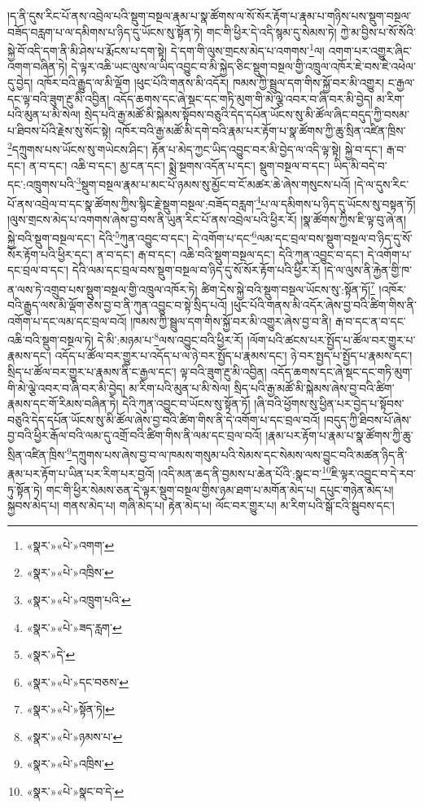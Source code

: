 །ད་ནི་དུས་རིང་པོ་ནས་འབྲེལ་པའི་སྡུག་བསྔལ་རྣམ་པ་སྣ་ཚོགས་ལ་སོ་སོར་རྟོག་པ་རྣམ་པ་གཉིས་པས་སྡུག་བསྔལ་བཟོད་བརླག་པ་ལ་དམིགས་པ་ཉིད་དུ་ཡོངས་སུ་སྟོན་ཏེ། གང་གི་ཕྱིར་དེ་འདི་སྙམ་དུ་སེམས་ཏེ། ཀྱེ་མ་བྱིས་པ་སོ་སོའི་སྐྱེ་བོ་འདི་དག་ནི་མི་ཤེས་པ་རྨོངས་པ་དག་སྟེ། དེ་དག་གི་ལུས་གྲངས་མེད་པ་འགགས་\footnote{«སྣར་»«པེ་»འགག་}ལ། འགག་པར་འགྱུར་ཞིང་འགག་བཞིན་ཏེ། དེ་ལྟར་འཆི་ཡང་ལུས་ལ་ཡིད་འབྱུང་བ་མི་སྐྱེད་ཅིང་སྡུག་བསྔལ་གྱི་འཁྲུལ་འཁོར་ཇེ་བས་ཇེ་འཕེལ་དུ་བྱེད། འཁོར་བའི་རྒྱུད་ལ་མི་ལྡོག །ཕུང་པོའི་གནས་མི་འདོར། ཁམས་ཀྱི་སྦྲུལ་དག་གིས་སྐྱོ་བར་མི་འགྱུར། ང་རྒྱལ་དང་ལྟ་བའི་ཟུག་རྔུ་མི་འབྱིན། འདོད་ཆགས་དང་ཞེ་སྡང་དང་གཏི་མུག་གི་མེ་ལྕེ་འབར་བ་ཞི་བར་མི་བྱེད། མ་རིག་པའི་མུན་པ་མི་སེལ། སྲེད་པའི་རྒྱ་མཚོ་མི་སྐེམས་སྟོབས་བཅུའི་དེད་དཔོན་ཡོངས་སུ་མི་ཚོལ་ཞིང་བདུད་ཀྱི་བསམ་པ་ཐིབས་པོའི་རྗེས་སུ་སོང་སྟེ། འཁོར་བའི་རྒྱ་མཚོ་མི་དགེ་བའི་རྣམ་པར་རྟོག་པ་སྣ་ཚོགས་ཀྱི་ཆུ་སྲིན་འཛིན་ཁྲིས་\footnote{«སྣར་»«པེ་»འཁྲིས་}དཀྲུགས་པས་ཡོངས་སུ་གཡེངས་ཤིང་། རྟོན་པ་མེད་ཀྱང་ཡིད་འབྱུང་བར་མི་བྱེད་ལ་འདི་ལྟ་སྟེ། སྐྱེ་བ་དང་། རྒ་བ་དང་། ན་བ་དང་། འཆི་བ་དང་། མྱ་ངན་དང་། སྨྲེ་སྔགས་འདོན་པ་དང་། སྡུག་བསྔལ་བ་དང་། ཡིད་མི་བདེ་བ་དང་:འཁྲུགས་པའི་\footnote{«སྣར་»«པེ་»འཁྲུག་པའི་}སྡུག་བསྔལ་རྣམ་པ་མང་པོ་ཉམས་སུ་མྱོང་བ་ངོ་མཚར་ཆེ་ཞེས་གསུངས་པའོ། །དེ་ལ་དུས་རིང་པོ་ནས་འབྲེལ་བ་དང་སྣ་ཚོགས་ཀྱིས་སྙིང་རྗེ་སྡུག་བསྔལ་:བཟོད་བརླག་\footnote{«སྣར་»«པེ་»ཟད་རླག་}པ་ལ་དམིགས་པ་ཉིད་དུ་ཡོངས་སུ་བསྟན་ཏོ། །ལུས་གྲངས་མེད་པ་འགགས་ཞེས་བྱ་བས་ནི་ཡུན་རིང་པོ་ནས་འབྲེལ་པའི་ཕྱིར་རོ། །སྣ་ཚོགས་ཀྱིས་ཇི་ལྟ་བུ་ཞེ་ན། སྐྱེ་བའི་སྡུག་བསྔལ་དང་། དེའི་\footnote{«སྣར་»དེ་}ཀུན་འབྱུང་བ་དང་། དེ་འགོག་པ་དང་\footnote{«སྣར་»«པེ་»དང་བཅས་}ལམ་དང་བྲལ་བས་སྡུག་བསྔལ་བ་ཉིད་དུ་སོ་སོར་རྟོག་པའི་ཕྱིར་དང་། ན་བ་དང་། རྒ་བ་དང་། འཆི་བའི་སྡུག་བསྔལ་དང་། དེའི་ཀུན་འབྱུང་བ་དང་། དེ་འགོག་པ་དང་བྲལ་བ་དང་། དེའི་ལམ་དང་བྲལ་བས་སྡུག་བསྔལ་བ་ཉིད་དུ་སོ་སོར་རྟོག་པའི་ཕྱིར་རོ། །དེ་ལ་ལུས་ནི་རྐྱེན་གྱི་ཁ་ན་ལས་ཏེ་འགྲུབ་པས་སྡུག་བསྔལ་གྱི་འཁྲུལ་འཁོར་ཏེ། ཚིག་དེས་སྐྱེ་བའི་སྡུག་བསྔལ་ཡོངས་སུ་:སྟོན་ཏོ།\footnote{«སྣར་»«པེ་»སྟོན་ཏེ།} །འཁོར་བའི་རྒྱུད་ལས་མི་ལྡོག་ཅེས་བྱ་བ་ནི་ཀུན་འབྱུང་བ་སྟེ་སྲིད་པའོ། །ཕུང་པོའི་གནས་མི་འདོར་ཞེས་བྱ་བའི་ཚིག་གིས་ནི་འགོག་པ་དང་ལམ་དང་བྲལ་བའོ། །ཁམས་ཀྱི་སྦྲུལ་དག་གིས་སྐྱོ་བར་མི་འགྱུར་ཞེས་བྱ་བ་ནི། རྒ་བ་དང་ན་བ་དང་འཆི་བའི་སྡུག་བསྔལ་ཏེ། དེ་མི་:མཉམ་པ་\footnote{«སྣར་»«པེ་»ཉམས་པ་}ལས་འབྱུང་བའི་ཕྱིར་རོ། །ལོག་པའི་ཚངས་པར་སྤྱོད་པ་ཚོལ་བར་གྱུར་པ་རྣམས་དང་། འདོད་པ་ཚོལ་བར་གྱུར་པ་འདོད་པ་ལ་ཉེ་བར་སྤྱོད་པ་རྣམས་དང་། ཉེ་བར་སྤྱད་པ་སྤྱོད་པ་རྣམས་དང་། སྲིད་པ་ཚོལ་བར་གྱུར་པ་རྣམས་ནི་ང་རྒྱལ་དང་། ལྟ་བའི་ཟུག་རྔུ་མི་འབྱིན། འདོད་ཆགས་དང་ཞེ་སྡང་དང་གཏི་མུག་གི་མེ་ལྕེ་འབར་བ་ཞི་བར་མི་བྱེད། མ་རིག་པའི་མུན་པ་མི་སེལ། སྲིད་པའི་རྒྱ་མཚོ་མི་སྐེམས་ཞེས་བྱ་བའི་ཚིག་རྣམས་དང་གོ་རིམས་བཞིན་ཏེ། དེའི་ཀུན་འབྱུང་བ་ཡོངས་སུ་སྟོན་ཏོ། །ཞི་བའི་ཕྱོགས་སུ་ཕྱིན་པར་བྱེད་པ་སྟོབས་བཅུའི་དེད་དཔོན་ཡོངས་སུ་མི་ཚོལ་ཞེས་བྱ་བའི་ཚིག་གིས་ནི་དེ་འགོག་པ་དང་བྲལ་བའོ། །བདུད་ཀྱི་ཐིབས་པོ་ཞེས་བྱ་བའི་ཕྱིར་རྒོལ་བའི་ལམ་དུ་འགྲོ་བའི་ཚིག་གིས་ནི་ལམ་དང་བྲལ་བའོ། །རྣམ་པར་རྟོག་པ་རྣམ་པ་སྣ་ཚོགས་ཀྱི་ཆུ་སྲིན་འཛིན་ཁྲིས་\footnote{«སྣར་»«པེ་»འཁྲིས་}དཀྲུགས་པས་ཞེས་བྱ་བ་ལ་ཁམས་གསུམ་པའི་སེམས་དང་སེམས་ལས་བྱུང་བའི་མཚན་ཉིད་ནི་རྣམ་པར་རྟོག་པ་ཡིན་པར་རིག་པར་བྱའོ། །འདི་མན་ཆད་ནི་བྱམས་པ་ཆེན་པོའི་:སྣང་བ་\footnote{«སྣར་»«པེ་»སྣང་བ་དེ་}ཇི་ལྟར་འབྱུང་བ་དེ་རབ་ཏུ་སྟོན་ཏེ། གང་གི་ཕྱིར་སེམས་ཅན་དེ་ལྟར་སྡུག་བསྔལ་གྱིས་ཉམ་ཐག་པ་མགོན་མེད་པ། དཔུང་གཉེན་མེད་པ། སྐྱབས་མེད་པ། གནས་མེད་པ། གཞི་མེད་པ། རྟེན་མེད་པ། ལོང་བར་གྱུར་པ། མ་རིག་པའི་སྒོ་ངའི་སྦུབས་དང་། 